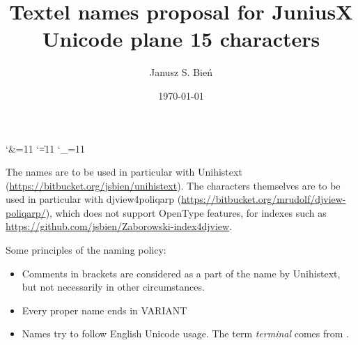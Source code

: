 \documentclass{mwart}
\begin{document}
% 
\title{Textel names proposal for JuniusX\\ Unicode plane 15 characters}

\author{Janusz S. Bień}

\date{\today\\\gitAuthorIsoDate}

\maketitle

\catcode`\&=11
\catcode`\|=11
\catcode`\_=11




The names are to be used in particular with \textsf{Unihistext}
(\url{https://bitbucket.org/jsbien/unihistext}).  The characters
themselves are to be used in particular with \textsf{djview4poliqarp}
(\url{https://bitbucket.org/mrudolf/djview-poliqarp/}), which does not
support OpenType features, for indexes such as
\url{https://github.com/jsbien/Zaborowski-index4djview}.

Some principles of the naming policy:
\begin{itemize}
\item Comments in brackets are considered as a part of the name by \textsf{Unihistext}, but not necessarily in other circumstances.
\item Every proper name ends in VARIANT
\item Names try to follow English Unicode usage. The term
  \textit{terminal} comes from
  \autocite{gaskell76:_nomec_letter_roman_type}.

\end{itemize}
\end{document}
